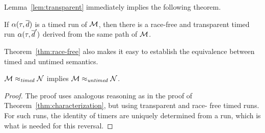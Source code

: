 Lemma~\ref{lem:transparent}  immediately implies the following
theorem.


\begin{theorem}
  \label{thm:race-free}
  If $\alpha(\tau,\overline{d})$ is a timed run of ${\mathcal M}$, then there is
  a race-free and transparent timed run $\alpha(\tau,\overline{d}')$ derived
  from the same path of ${\mathcal M}$.
\end{theorem}

Theorem~\ref{thm:race-free} also makes it easy to establish the equivalence
between timed and untimed semantics.

\begin{theorem}
\label{timedimpliesuntimed}
${\mathcal M} \approx_{\mathit{timed}} {\mathcal N}$
implies
${\mathcal M} \approx_{\mathit{untimed}} {\mathcal N}$.
\end{theorem}

\begin{proof}
  The proof uses analogous reasoning as in the proof of
  Theorem~\ref{thm:characterization}, but using transparent and race-
  free timed runs. For such runs, the identity of timers are uniquely
  determined from a run, which is what is needed for this reversal.
\end{proof}





